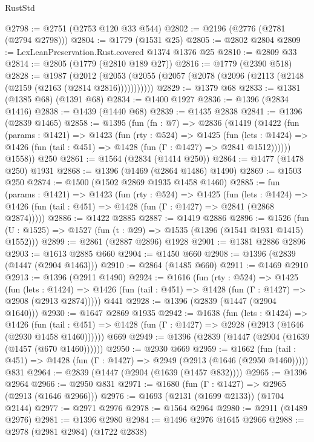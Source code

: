 \begin{lexlean}{RustStd}
\begin{coremodule}
@2798 := @2751 (@2753 @120 @33 @544)
@2802 := @2196 (@2776 (@2781 (@2794 @2798)))
@2804 := @1779 (@1531 @25)
@2805 := @2802 @2804
@2809 := LexLeanPreservation.Rust.covered @1374 @1376 @25
@2810 := @2809 @33
@2814 := @2805 (@1779 (@2810 @189 @27))
@2816 := @1779 (@2390 @518)
@2828 := @1987
    (@2012 (@2053 (@2055 (@2057 (@2078 (@2096 (@2113 (@2148 (@2159 (@2163 (@2814 @2816)))))))))))
@2829 := @1379 @68
@2833 := @1381 (@1385 @68) (@1391 @68)
@2834 := @1400 @1927
@2836 := @1396 (@2834 @1416)
@2838 := @1439 (@1440 @68)
@2839 := @1435 @2838
@2841 := @1396 (@2839 @1465)
@2858 := @1395
    (fun (fn : @7) =>
    @2836
      (@1419
        (@1422
          (fun (params : @1421) =>
          @1423
            (fun (rty : @524) =>
            @1425
              (fun (lets : @1424) =>
              @1426 (fun (tail : @451) => @1428 (fun (Γ : @1427) => @2841 @1512))))))
        @1558))
    @250
@2861 := @1564 (@2834 (@1414 @250))
@2864 := @1477 (@1478 @250) @1931
@2868 := @1396 (@1469 (@2864 @1486) @1490)
@2869 := @1503 @250
@2874 := @1500 (@1502 @2869 @1935 @1458 @1460)
@2885 := fun (params : @1421) =>
  @1423
    (fun (rty : @524) =>
    @1425
      (fun (lets : @1424) =>
      @1426 (fun (tail : @451) => @1428 (fun (Γ : @1427) => @2841 (@2868 @2874)))))
@2886 := @1422 @2885
@2887 := @1419 @2886
@2896 := @1526 (fun (U : @1525) => @1527 (fun (t : @29) => @1535 (@1396 (@1541 @1931 @1415) @1552)))
@2899 := @2861 (@2887 @2896) @1928
@2901 := @1381 @2886 @2896
@2903 := @1613 @2885 @660
@2904 := @1450 @660
@2908 := @1396 (@2839 (@1447 (@2904 @1463)))
@2910 := @2864 (@1485 @660)
@2911 := @1469 @2910
@2913 := @1396 (@2911 @1490)
@2924 := @1616
    (fun (rty : @524) =>
    @1425
      (fun (lets : @1424) =>
      @1426 (fun (tail : @451) => @1428 (fun (Γ : @1427) => @2908 (@2913 @2874)))))
    @441
@2928 := @1396 (@2839 (@1447 (@2904 @1640)))
@2930 := @1647 @2869 @1935
@2942 := @1638
    (fun (lets : @1424) =>
    @1426
      (fun (tail : @451) => @1428 (fun (Γ : @1427) => @2928 (@2913 (@1646 (@2930 @1458 @1460))))))
    @669
@2949 := @1396 (@2839 (@1447 (@2904 (@1639 (@1457 (@670 @1460))))))
@2950 := @2930 @669
@2959 := @1662
    (fun (tail : @451) => @1428 (fun (Γ : @1427) => @2949 (@2913 (@1646 (@2950 @1460)))))
    @831
@2964 := @2839 (@1447 (@2904 (@1639 (@1457 @832))))
@2965 := @1396 @2964
@2966 := @2950 @831
@2971 := @1680 (fun (Γ : @1427) => @2965 (@2913 (@1646 @2966)))
@2976 := @1693 (@2131 (@1699 @2133)) (@1704 @2144)
@2977 := @2971 @2976
@2978 := @1564 @2964
@2980 := @2911 (@1489 @2976)
@2981 := @1396 @2980
@2984 := @1496 @2976 @1645 @2966
@2988 := @2978 (@2981 @2984) (@1722 @2838)

\end{coremodule}
\end{lexlean}
